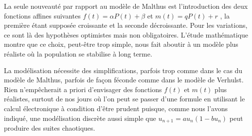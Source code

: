 La seule nouveauté par rapport au modèle de Malthus est l'introduction des deux fonctions affines suivantes $f(t) = \alpha P(t) + \beta$ et $m(t) = q P(t) + r$ , la première étant supposée croissante et la seconde décroissante. Pour les variations, ce sont là des hypothèses optimistes mais non obligatoires. L'étude mathématique montre que ce choix, peut-être trop simple, nous fait aboutir à un modèle plus réaliste où la population se stabilise à long terme.


\medskip

La modélisation nécessite des simplifications, parfois trop comme dans le cas du modèle de Malthus, parfois de façon féconde comme dans le modèle de Verhulst. Rien n'empêcherait a priori d'envisager des fonctions $f(t)$ et $m(t)$ plus réalistes, surtout de nos jours où l'on peut se passer d'une formule en utilisant le calcul électronique à condition d'être prudent puisque, comme nous l'avons indiqué, une modélisation discrète aussi simple que $u_{n+1} = a u_n( 1 - b u_n)$  peut produire des suites chaotiques. 